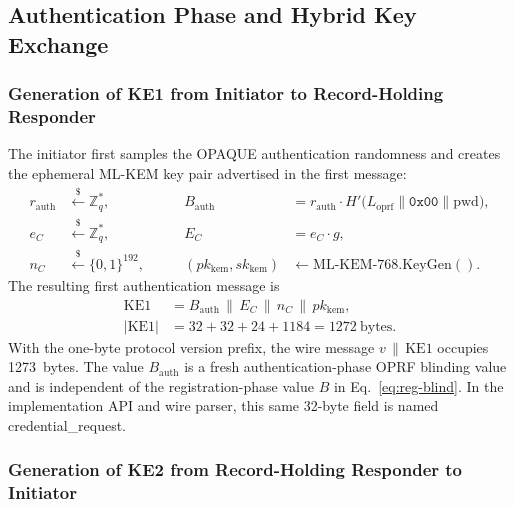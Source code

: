 \documentclass[preprint,12pt]{elsarticle}
\newcommand{\Label}[1]{L_{\mathrm{#1}}}
\newcommand{\codeid}[1]{\textsf{#1}}
\theoremstyle{remark}
\begin{document}
\subsection{Authentication Phase and Hybrid Key Exchange}

\subsubsection{Generation of KE1 from Initiator to Record-Holding Responder}

The initiator first samples the OPAQUE authentication randomness and creates
the ephemeral ML-KEM key pair advertised in the first message:
\begin{equation}
  \begin{alignedat}{2}
    r_{\mathrm{auth}} &\xleftarrow{\$} \mathbb{Z}_q^*,        &\qquad
    B_{\mathrm{auth}}
      &= r_{\mathrm{auth}} \cdot
        H'\!\bigl(\Label{oprf} \| \mathtt{0x00} \| \mathrm{pwd}\bigr),\\
    e_C &\xleftarrow{\$} \mathbb{Z}_q^*,        &\qquad
    E_C &= e_C \cdot g,\\
    n_C &\xleftarrow{\$} \{0,1\}^{192},         &\qquad
    (pk_{\mathrm{kem}},sk_{\mathrm{kem}})
        &\leftarrow \mathrm{ML\text{-}KEM\text{-}768.KeyGen}().
  \end{alignedat}
\end{equation}
The resulting first authentication message is
\begin{equation}
  \begin{aligned}
    \mathrm{KE1}
      &= B_{\mathrm{auth}} \,\|\, E_C \,\|\, n_C \,\|\, pk_{\mathrm{kem}},\\
    |\mathrm{KE1}|
      &= 32 + 32 + 24 + 1184
       = 1272~\text{bytes}.
  \end{aligned}
\end{equation}
With the one-byte protocol version prefix, the wire message
$v \,\|\, \mathrm{KE1}$ occupies 1273~bytes.
The value $B_{\mathrm{auth}}$ is a fresh authentication-phase OPRF
blinding value and is independent of the registration-phase value $B$ in
Eq.~\eqref{eq:reg-blind}. In the implementation API and wire parser,
this same 32-byte field is named \codeid{credential\_request}.

\subsubsection{Generation of KE2 from Record-Holding Responder to Initiator}
\end{document}
